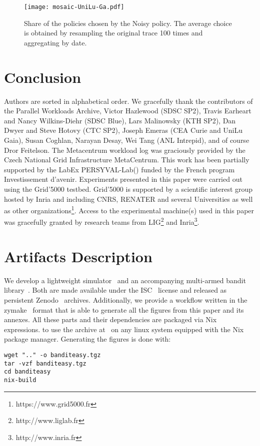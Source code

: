 \documentclass[sigconf]{acmart}
\begin{document}
\begin{figure}[ht]
  \centering
  \texttt{[image: mosaic-UniLu-Ga.pdf]}
  \caption{Share of the policies chosen by the Noisy policy. The average
  choice is obtained by resampling the original trace 100 times and
  aggregating by date.}
  \label{fig:mosn}
\end{figure}

\section{Conclusion}
\label{sec:ccl}

\begin{acks}

Authors are sorted in alphabetical order. We gracefully thank the contributors
of the Parallel Workloads Archive, Victor Hazlewood (SDSC SP2), Travis Earheart
and Nancy Wilkins-Diehr (SDSC Blue), Lars Malinowsky (KTH SP2), Dan Dwyer and
Steve Hotovy (CTC SP2), Joseph Emeras (CEA Curie and UniLu Gaia), Susan
Coghlan, Narayan Desay, Wei Tang (ANL Intrepid), and of course Dror Feitelson.
The Metacentrum workload log was graciously provided by the Czech National Grid
Infrastructure MetaCentrum. This work has been partially supported by the LabEx
PERSYVAL-Lab() funded by
the French program Investissement d'avenir. Experiments presented in this paper
were carried out using the Grid'5000 testbed. Grid'5000 is supported by a
scientific interest group hosted by Inria and including CNRS, RENATER and
several Universities as well as other
organizations\footnote{https://www.grid5000.fr}.  Access to the experimental
machine(s) used in this paper was gracefully granted by research teams from
LIG\footnote{http://www.liglab.fr} and Inria\footnote{http://www.inria.fr}.

\end{acks}




\clearpage
\section*{Artifacts Description}

We develop a lightweight simulator~\cite{ocst} and an accompanying multi-armed
bandit library~\cite{obandit}. Both are made available under the ISC~\cite{isc}
license and released as persistent Zenodo~\cite{zenodo} archives. Additionally,
we provide a workflow written in the zymake~\cite{breck2008zymake} format that
is able to generate all the figures from this paper and its annexes. All these
parts and their dependencies are packaged via Nix~\cite{nix} expressions.
to use the
archive at~\cite{repro} on any linux system equipped with the Nix package manager.
Generating the figures is done with:

\begin{lstlisting}
wget ".." -o banditeasy.tgz
tar -vzf banditeasy.tgz
cd banditeasy
nix-build
\end{lstlisting}
\end{document}
